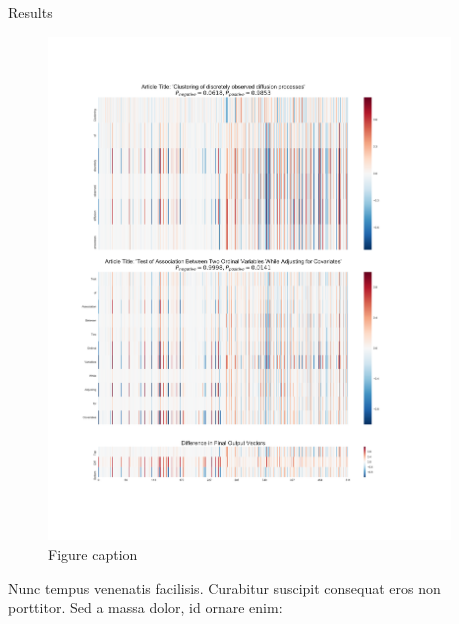 \documentclass[final]{beamer}
\newlength{\onecolwid}
\newlength{\twocolwid}
\begin{document}
\begin{frame}[t]
\begin{columns}[t]
\begin{column}{\twocolwid}
\begin{columns}[t,totalwidth=\twocolwid]
\begin{column}{\onecolwid}
					
				\end{column} %
				
				\begin{column}{\onecolwid} %
					
					
					\begin{block}{Results}
						
						\begin{figure}
							\includegraphics[width=0.8\linewidth]{comparisonTitle.pdf}
							\caption{Figure caption}
						\end{figure}
						
						Nunc tempus venenatis facilisis. Curabitur suscipit consequat eros non porttitor. Sed a massa dolor, id ornare enim:
						

\end{block}
\end{column}
\end{columns}
\end{column}
\end{columns}
\end{frame}
\end{document}
